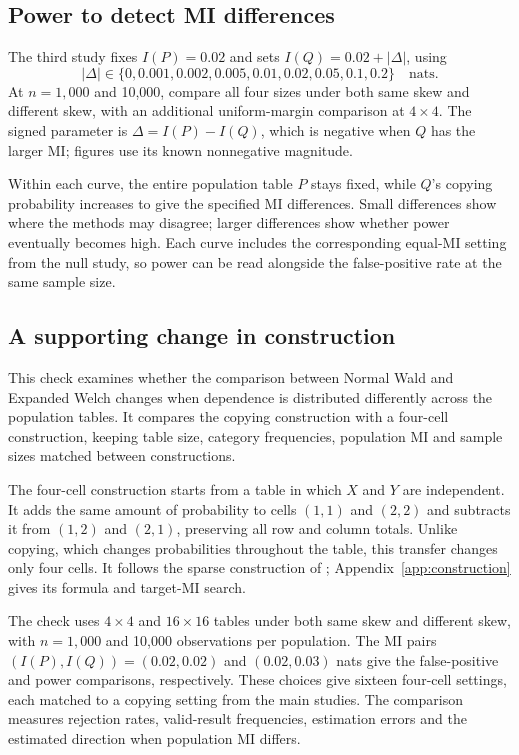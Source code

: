 \subsection{Power to detect MI differences}

The third study fixes \(I(P)=0.02\) and sets \(I(Q)=0.02+|\Delta|\),
using
\begin{equation}
 |\Delta|\in\{0,0.001,0.002,0.005,0.01,0.02,0.05,0.1,0.2\}
 \quad\text{nats}.
 \label{eq:detection-grid}
\end{equation}
At \(n=1{,}000\) and 10,000, compare all four sizes under both same skew
and different skew, with an additional uniform-margin comparison at
\(4\times4\).
The signed parameter is \(\Delta=I(P)-I(Q)\), which is negative
when \(Q\) has the larger MI; figures use its known nonnegative magnitude.

Within each curve, the entire population table \(P\) stays fixed, while
\(Q\)'s copying probability increases to give the specified MI differences.
Small differences show where the methods may
disagree; larger differences show whether power eventually becomes high.
Each curve includes the corresponding equal-MI setting from the null
study, so power can be read alongside the false-positive rate at the
same sample size.

\subsection{A supporting change in construction}

This check examines whether the comparison between Normal Wald and Expanded
Welch changes when dependence is distributed differently across the
population tables. It compares the copying construction with a four-cell
construction, keeping table size, category frequencies, population MI and
sample sizes matched between constructions.

The four-cell construction starts from a table in which \(X\) and \(Y\)
are independent. It adds the same amount of probability to cells \((1,1)\)
and \((2,2)\) and subtracts it from \((1,2)\) and \((2,1)\), preserving
all row and column totals. Unlike copying, which changes probabilities
throughout the table, this transfer changes only four cells. It follows
the sparse construction of \citet[Section~3(b)]{berrett2021};
Appendix~\ref{app:construction} gives its formula and target-MI search.

The check uses \(4\times4\) and \(16\times16\) tables under both same
skew and different skew, with \(n=1{,}000\) and 10,000 observations per
population. The MI pairs \((I(P),I(Q))=(0.02,0.02)\) and
\((0.02,0.03)\) nats give the false-positive and power comparisons,
respectively. These choices give sixteen four-cell settings, each matched
to a copying setting from the main studies. The comparison measures
rejection rates, valid-result frequencies, estimation errors and the
estimated direction when population MI differs.

